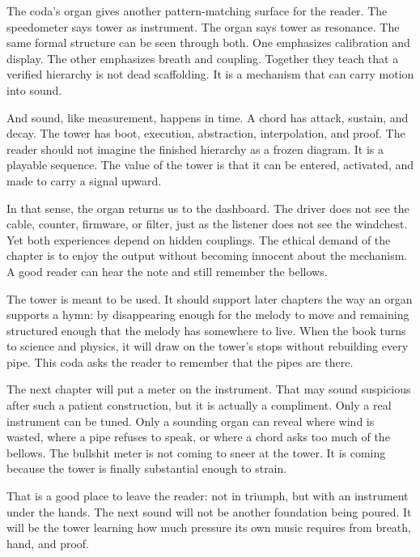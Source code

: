 The coda's organ gives another pattern-matching surface for the reader. The
speedometer says tower as instrument. The organ says tower as resonance. The
same formal structure can be seen through both. One emphasizes calibration and
display. The other emphasizes breath and coupling. Together they teach that a
verified hierarchy is not dead scaffolding. It is a mechanism that can carry
motion into sound.

And sound, like measurement, happens in time. A chord has attack, sustain, and
decay. The tower has boot, execution, abstraction, interpolation, and proof.
The reader should not imagine the finished hierarchy as a frozen diagram. It
is a playable sequence. The value of the tower is that it can be entered,
activated, and made to carry a signal upward.

In that sense, the organ returns us to the dashboard. The driver does not see
the cable, counter, firmware, or filter, just as the listener does not see the
windchest. Yet both experiences depend on hidden couplings. The ethical demand
of the chapter is to enjoy the output without becoming innocent about the
mechanism. A good reader can hear the note and still remember the bellows.

The tower is meant to be used. It should support later chapters the way an
organ supports a hymn: by disappearing enough for the melody to move and
remaining structured enough that the melody has somewhere to live. When the
book turns to science and physics, it will draw on the tower's stops without
rebuilding every pipe. This coda asks the reader to remember that the pipes are
there.

The next chapter will put a meter on the instrument. That may sound suspicious
after such a patient construction, but it is actually a compliment. Only a real
instrument can be tuned. Only a sounding organ can reveal where wind is wasted,
where a pipe refuses to speak, or where a chord asks too much of the bellows.
The bullshit meter is not coming to sneer at the tower. It is coming because
the tower is finally substantial enough to strain.

That is a good place to leave the reader: not in triumph, but with an
instrument under the hands. The next sound will not be another foundation being
poured. It will be the tower learning how much pressure its own music requires
from breath, hand, and proof.

